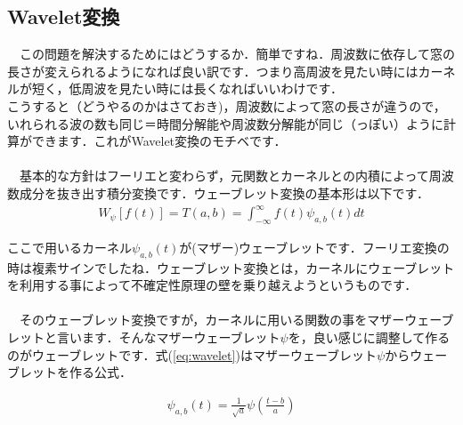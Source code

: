 \documentclass[11pt,a4paper]{ujreport} 	%
\begin{document}
\subsection{Wavelet変換}
　この問題を解決するためにはどうするか．簡単ですね．周波数に依存して窓の長さが変えられるようになれば良い訳です．つまり高周波を見たい時にはカーネルが短く，低周波を見たい時には長くなればいいわけです．\\


こうすると（どうやるのかはさておき)，周波数によって窓の長さが違うので，いれられる波の数も同じ＝時間分解能や周波数分解能が同じ（っぽい）ように計算ができます．これがWavelet変換のモチベです．\\
\\
　基本的な方針はフーリエと変わらず，元関数とカーネルとの内積によって周波数成分を抜き出す積分変換です．ウェーブレット変換の基本形は以下です．\\

\begin{eqnarray}
W_\psi[f(t)]  = T(a,b) = \int_{-\infty}^{\infty} f(t)\psi_{a,b}(t) dt
\label{eq:wavelet_transform}
\end{eqnarray}

ここで用いるカーネル$\psi_{a,b}(t)$が(マザー)ウェーブレットです．フーリエ変換の時は複素サインでしたね．ウェーブレット変換とは，カーネルにウェーブレットを利用する事によって不確定性原理の壁を乗り越えようというものです．\\
\\
　そのウェーブレット変換ですが，カーネルに用いる関数の事をマザーウェーブレットと言います．そんなマザーウェーブレット$\psi$を，良い感じに調整して作るのがウェーブレットです．式(\ref{eq:wavelet})はマザーウェーブレット$\psi$からウェーブレットを作る公式．

\begin{eqnarray}
\psi_{a,b}(t)  = \frac{1}{\sqrt{a}}\psi(\frac{t-b}{a})
\label{eq:wavelet}
\end{eqnarray}
\end{document}
